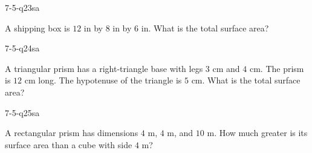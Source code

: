 \begin{practiceQuestion}{7-5-q23}{sa}
\begin{questionText}
A shipping box is $12$ in by $8$ in by $6$ in. What is the total surface area?
\end{questionText}
\end{practiceQuestion}

\begin{practiceQuestion}{7-5-q24}{sa}
\begin{questionText}
A triangular prism has a right-triangle base with legs $3$ cm and $4$ cm. The prism is $12$ cm long. The hypotenuse of the triangle is $5$ cm. What is the total surface area?
\end{questionText}
\end{practiceQuestion}

\begin{practiceQuestion}{7-5-q25}{sa}
\begin{questionText}
A rectangular prism has dimensions $4$ m, $4$ m, and $10$ m. How much greater is its surface area than a cube with side $4$ m?
\end{questionText}
\end{practiceQuestion}


